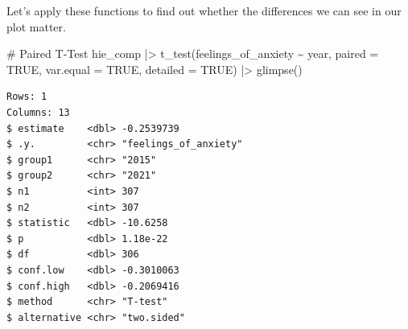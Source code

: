 \documentclass[
  letterpaper,
  DIV=11,
  numbers=noendperiod]{scrreprt}
\newenvironment{Shaded}{\begin{snugshade}}{\end{snugshade}}
\newcommand{\AttributeTok}[1]{\textcolor[rgb]{0.40,0.45,0.13}{#1}}
\newcommand{\CommentTok}[1]{\textcolor[rgb]{0.37,0.37,0.37}{#1}}
\newcommand{\ConstantTok}[1]{\textcolor[rgb]{0.56,0.35,0.01}{#1}}
\newcommand{\FunctionTok}[1]{\textcolor[rgb]{0.28,0.35,0.67}{#1}}
\newcommand{\NormalTok}[1]{\textcolor[rgb]{0.00,0.23,0.31}{#1}}
\newcommand{\SpecialCharTok}[1]{\textcolor[rgb]{0.37,0.37,0.37}{#1}}
\begin{document}
\begin{table}

\caption{\label{tbl-comparing-two-groups-paired}Comparing two paired
groups}


\end{table}%

Let's apply these functions to find out whether the differences we can
see in our plot matter.

\begin{Shaded}
\begin{Highlighting}[]
\CommentTok{\# Paired T{-}Test}
\NormalTok{hie\_comp }\SpecialCharTok{|\textgreater{}}
  \FunctionTok{t\_test}\NormalTok{(feelings\_of\_anxiety }\SpecialCharTok{\textasciitilde{}}\NormalTok{ year,}
         \AttributeTok{paired =} \ConstantTok{TRUE}\NormalTok{,}
         \AttributeTok{var.equal =} \ConstantTok{TRUE}\NormalTok{,}
         \AttributeTok{detailed =} \ConstantTok{TRUE}\NormalTok{) }\SpecialCharTok{|\textgreater{}}
  \FunctionTok{glimpse}\NormalTok{()}
\end{Highlighting}
\end{Shaded}

\begin{verbatim}
Rows: 1
Columns: 13
$ estimate    <dbl> -0.2539739
$ .y.         <chr> "feelings_of_anxiety"
$ group1      <chr> "2015"
$ group2      <chr> "2021"
$ n1          <int> 307
$ n2          <int> 307
$ statistic   <dbl> -10.6258
$ p           <dbl> 1.18e-22
$ df          <dbl> 306
$ conf.low    <dbl> -0.3010063
$ conf.high   <dbl> -0.2069416
$ method      <chr> "T-test"
$ alternative <chr> "two.sided"
\end{verbatim}
\end{document}
